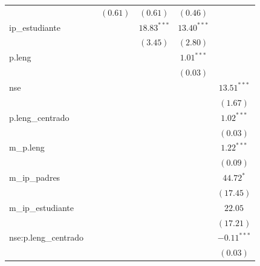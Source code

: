 \documentclass[
]{article}
\begin{document}
\begin{table}
\begin{center}
\begin{tabular}{l c c c c c}
                                 &                & $(0.61)$       & $(0.61)$       & $(0.46)$       &                \\
ip\_estudiante                   &                &                & $18.83^{***}$  & $13.40^{***}$  &                \\
                                 &                &                & $(3.45)$       & $(2.80)$       &                \\
p.leng                           &                &                &                & $1.01^{***}$   &                \\
                                 &                &                &                & $(0.03)$       &                \\
nse                              &                &                &                &                & $13.51^{***}$  \\
                                 &                &                &                &                & $(1.67)$       \\
p.leng\_centrado                 &                &                &                &                & $1.02^{***}$   \\
                                 &                &                &                &                & $(0.03)$       \\
m\_p.leng                        &                &                &                &                & $1.22^{***}$   \\
                                 &                &                &                &                & $(0.09)$       \\
m\_ip\_padres                    &                &                &                &                & $44.72^{*}$    \\
                                 &                &                &                &                & $(17.45)$      \\
m\_ip\_estudiante                &                &                &                &                & $22.05$        \\
                                 &                &                &                &                & $(17.21)$      \\
nse:p.leng\_centrado             &                &                &                &                & $-0.11^{***}$  \\
                                 &                &                &                &                & $(0.03)$       \\

\end{tabular}
\end{center}
\end{table}
\end{document}

